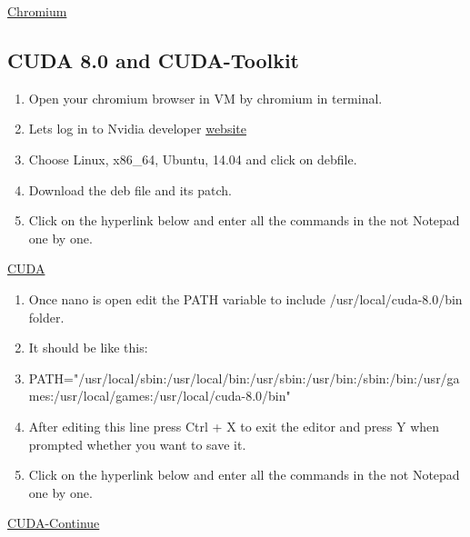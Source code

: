\documentclass[12pt]{article}
\begin{document}
\begin{center}
\href{run:./Text_Files_14/Chrome.txt}{\Large Chromium}
\end{center}

\subsection{CUDA 8.0 and CUDA-Toolkit}
\begin{enumerate}[resume]
  \item Open your chromium browser in VM by chromium in terminal.
  \item Lets log in to Nvidia developer  \href{https://developer.nvidia.com/cuda-downloads}{website}
  \item Choose Linux, x86\_64, Ubuntu, 14.04 and click on debfile.
  \item Download the deb file and its patch.
  \item Click on the hyperlink below and enter all the commands in the not Notepad one by one.
\end{enumerate}

\begin{center}
\href{run:./Text_Files_14/Cuda.txt}{\Large CUDA}
\end{center}

\begin{enumerate}[resume]
  \item Once nano is open edit the PATH variable to include /usr/local/cuda-8.0/bin folder.
  \item It should be like this:
  \item  {\scriptsize PATH="/usr/local/sbin:/usr/local/bin:/usr/sbin:/usr/bin:/sbin:/bin:/usr/games:/usr/local/games:/usr/local/cuda-8.0/bin"}
  \item After editing this line press Ctrl + X to exit the editor and press Y when prompted whether you want to save it.
  \item Click on the hyperlink below and enter all the commands in the not Notepad one by one.
\end{enumerate}

\begin{center}
\href{run:./Text_Files_14/Cuda1.txt}{\Large CUDA-Continue}
\end{center}


%
%
\end{document}
